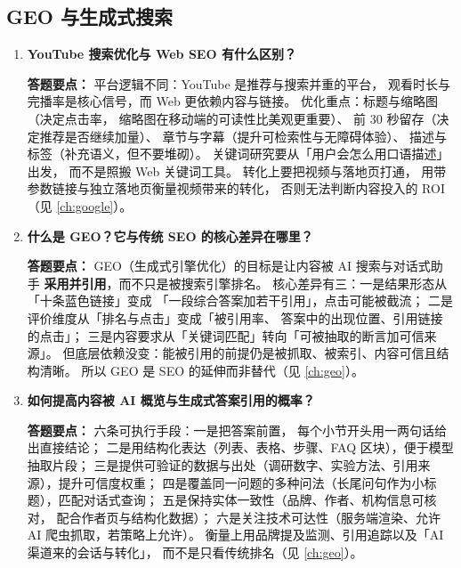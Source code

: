 \begin{interview}[题库与答题要点]
\begin{enumerate}[label=]
\end{enumerate}

\end{interview}

\subsection{GEO 与生成式搜索}

\begin{interview}[题库与答题要点]

\begin{enumerate}[label=]

  \item[\textcolor{VioletDeep}{\textbf{Q88.}}] \textbf{YouTube 搜索优化与 Web SEO 有什么区别？}
\par\smallskip\noindent\textcolor{VioletDeep}{\textbf{答题要点：}}
平台逻辑不同：YouTube 是推荐与搜索并重的平台，
观看时长与完播率是核心信号，而 Web 更依赖内容与链接。
优化重点：标题与缩略图（决定点击率，
缩略图在移动端的可读性比美观更重要）、
前 30 秒留存（决定推荐是否继续加量）、
章节与字幕（提升可检索性与无障碍体验）、
描述与标签（补充语义，但不要堆砌）。
关键词研究要从「用户会怎么用口语描述」出发，
而不是照搬 Web 关键词工具。
转化上要把视频与落地页打通，
用带参数链接与独立落地页衡量视频带来的转化，
否则无法判断内容投入的 ROI（见 \cref{ch:google}）。

  \item[\textcolor{VioletDeep}{\textbf{Q89.}}] \textbf{什么是 GEO？它与传统 SEO 的核心差异在哪里？}
\par\smallskip\noindent\textcolor{VioletDeep}{\textbf{答题要点：}}
GEO（生成式引擎优化）的目标是让内容被 AI 搜索与对话式助手
\textbf{采用并引用}，而不只是被搜索引擎排名。
核心差异有三：一是结果形态从「十条蓝色链接」变成
「一段综合答案加若干引用」，点击可能被截流；
二是评价维度从「排名与点击」变成「被引用率、
答案中的出现位置、引用链接的点击」；
三是内容要求从「关键词匹配」转向「可被抽取的断言加可信来源」。
但底层依赖没变：能被引用的前提仍是被抓取、被索引、内容可信且结构清晰。
所以 GEO 是 SEO 的延伸而非替代（见 \cref{ch:geo}）。

  \item[\textcolor{VioletDeep}{\textbf{Q90.}}] \textbf{如何提高内容被 AI 概览与生成式答案引用的概率？}
\par\smallskip\noindent\textcolor{VioletDeep}{\textbf{答题要点：}}
六条可执行手段：一是把答案前置，
每个小节开头用一两句话给出直接结论；
二是用结构化表达（列表、表格、步骤、FAQ 区块），便于模型抽取片段；
三是提供可验证的数据与出处（调研数字、实验方法、引用来源），提升可信度权重；
四是覆盖同一问题的多种问法（长尾问句作为小标题），匹配对话式查询；
五是保持实体一致性（品牌、作者、机构信息可核对，
配合作者页与结构化数据）；
六是关注技术可达性（服务端渲染、允许 AI 爬虫抓取，若策略上允许）。
衡量上用品牌提及监测、引用追踪以及「AI 渠道来的会话与转化」，
而不是只看传统排名（见 \cref{ch:geo}）。


\end{enumerate}
\end{interview}
